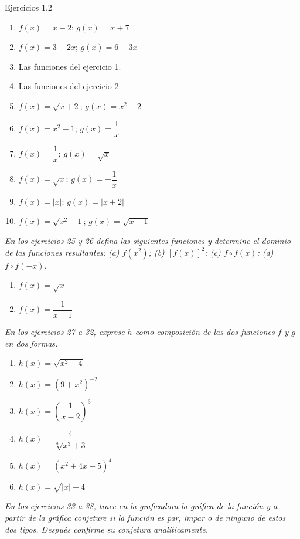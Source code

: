 \documentclass[aspectratio=169,10pt]{beamer}
\begin{document}
\begin{frame}{Ejercicios 1.2}
\begin{enumerate}
\item $f(x)=x-2$; $g(x)=x+7$
\item $f(x)=3-2x$; $g(x)=6-3x$
\item Las funciones del ejercicio 1.
\item Las funciones del ejercicio 2.
\item $f(x)=\sqrt{x+2}$; $g(x)=x^2-2$
\item $f(x)=x^2-1$; $g(x)=\dfrac1x$
\item $f(x)=\dfrac1x$; $g(x)=\sqrt{x}$
\item $f(x)=\sqrt{x}$; $g(x)=-\dfrac1x$
\item $f(x)=|x|$; $g(x)=|x+2|$
\item $f(x)=\sqrt{x^2-1}$; $g(x)=\sqrt{x-1}$
\end{enumerate}

\textit{En los ejercicios 25 y 26 defina las siguientes funciones y determine el dominio de las funciones resultantes: (a) $f(x^2)$; (b) $[f(x)]^2$; (c) $f\circ f(x)$; (d) $f\circ f(-x)$.}

\begin{enumerate}
\item $f(x)=\sqrt{x}$
\item $f(x)=\dfrac1{x-1}$
\end{enumerate}

\textit{En los ejercicios 27 a 32, exprese $h$ como composición de las dos funciones $f$ y $g$ en dos formas.}

\begin{enumerate}
\item $h(x)=\sqrt{x^2-4}$
\item $h(x)=(9+x^2)^{-2}$
\item $h(x)=\left(\dfrac1{x-2}\right)^3$
\item $h(x)=\dfrac4{\sqrt[3]{x^3+3}}$
\item $h(x)=(x^2+4x-5)^4$
\item $h(x)=\sqrt{|x|+4}$
\end{enumerate}

\textit{En los ejercicios 33 a 38, trace en la graficadora la gráfica de la función y a partir de la gráfica conjeture si la función es par, impar o de ninguno de estos dos tipos. Después confirme su conjetura analíticamente.}


\end{frame}
\end{document}
